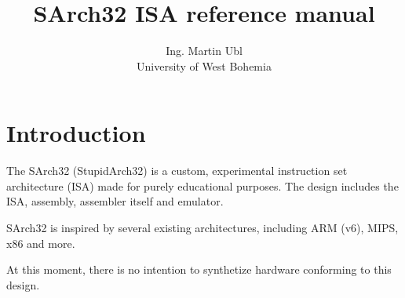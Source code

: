 \documentclass[titlepage]{article}
\title{SArch32 ISA reference manual}
\author{Ing. Martin Ubl\\ University of West Bohemia}
\begin{document}
\maketitle

\section{Introduction}

The SArch32 (StupidArch32) is a custom, experimental instruction set architecture (ISA) made for purely educational purposes. The design includes the ISA, assembly, assembler itself and emulator.

SArch32 is inspired by several existing architectures, including ARM (v6), MIPS, x86 and more.

At this moment, there is no intention to synthetize hardware conforming to this design.
	
\end{document}
